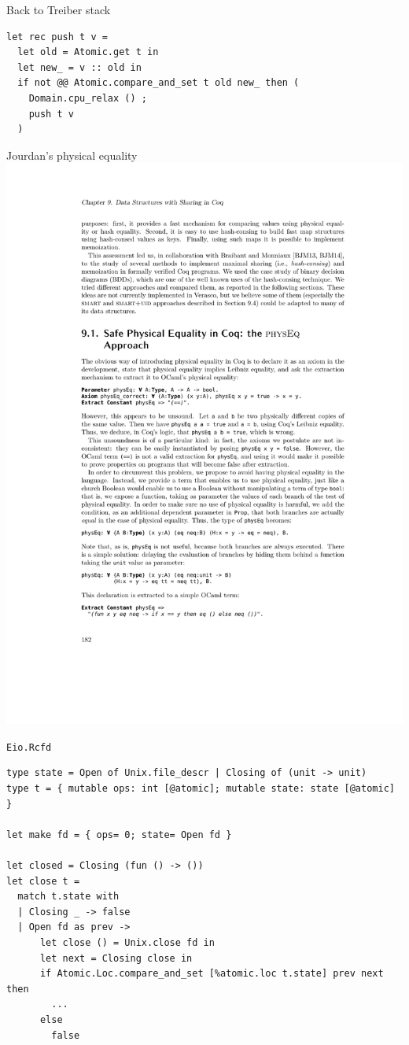 \begin{frame}[fragile]{Back to Treiber stack}
\Large
\begin{verbatim}
let rec push t v =
  let old = Atomic.get t in
  let new_ = v :: old in
  if not @@ Atomic.compare_and_set t old new_ then (
    Domain.cpu_relax () ;
    push t v
  )
\end{verbatim}
\end{frame}

\begin{frame}{Jourdan's physical equality}
\centering
\includegraphics[scale=0.5]{images/jourdan_physical_equality.pdf}
\end{frame}

\begin{frame}[fragile]{\texttt{Eio.Rcfd}}
\begin{verbatim}
type state = Open of Unix.file_descr | Closing of (unit -> unit)
type t = { mutable ops: int [@atomic]; mutable state: state [@atomic] }

let make fd = { ops= 0; state= Open fd }

let closed = Closing (fun () -> ())
let close t =
  match t.state with
  | Closing _ -> false
  | Open fd as prev ->
      let close () = Unix.close fd in
      let next = Closing close in
      if Atomic.Loc.compare_and_set [%atomic.loc t.state] prev next then
        ...
      else
        false
\end{verbatim}
\end{frame}

